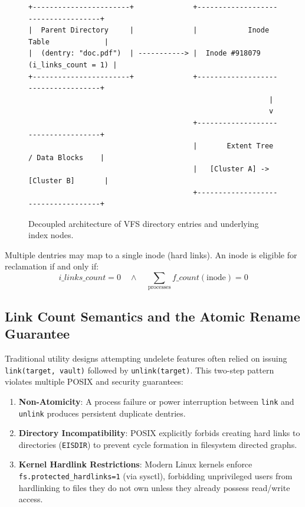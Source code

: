 \documentclass[11pt,a4paper]{article}
\begin{document}
\begin{figure}[h]
\centering
\begin{verbatim}
+-----------------------+              +------------------------------------+
|  Parent Directory     |              |            Inode Table             |
|  (dentry: "doc.pdf")  | -----------> |  Inode #918079 (i_links_count = 1) |
+-----------------------+              +------------------------------------+
                                                         |
                                                         v
                                       +------------------------------------+
                                       |       Extent Tree / Data Blocks    |
                                       |   [Cluster A] -> [Cluster B]       |
                                       +------------------------------------+
\end{verbatim}
\caption{Decoupled architecture of VFS directory entries and underlying index nodes.}
\label{fig:vfs_struct}
\end{figure}

Multiple dentries may map to a single inode (hard links). An inode is eligible for reclamation if and only if:
\begin{equation}
    i\_links\_count = 0 \quad \land \quad \sum_{\text{processes}} f\_count(\text{inode}) = 0
\end{equation}

\subsection{Link Count Semantics and the Atomic Rename Guarantee}
Traditional utility designs attempting undelete features often relied on issuing \texttt{link(target, vault)} followed by \texttt{unlink(target)}. This two-step pattern violates multiple POSIX and security guarantees:
\begin{enumerate}[leftmargin=1.5em]
    \item \textbf{Non-Atomicity}: A process failure or power interruption between \texttt{link} and \texttt{unlink} produces persistent duplicate dentries.
    \item \textbf{Directory Incompatibility}: POSIX explicitly forbids creating hard links to directories (\texttt{EISDIR}) to prevent cycle formation in filesystem directed graphs.
    \item \textbf{Kernel Hardlink Restrictions}: Modern Linux kernels enforce \texttt{fs.protected\_hardlinks=1} (via sysctl), forbidding unprivileged users from hardlinking to files they do not own unless they already possess read/write access.
\end{enumerate}
\end{document}
